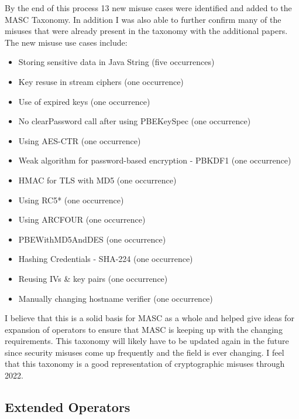 By the end of this process 13 new misuse cases were identified and added to the MASC Taxonomy. In addition I was also able to further confirm many of the misuses that were already present in the taxonomy with the additional papers.
The new misuse use cases include:
\begin{itemize}
    \item Storing sensitive data in Java String (five occurrences)
    \item Key resuse in stream ciphers (one occurrence)
    \item Use of expired keys (one occurrence)
    \item No clearPassword call after using PBEKeySpec (one occurrence)
    \item Using AES-CTR (one occurrence)
    \item Weak algorithm for password-based encryption - PBKDF1 (one occurrence)
    \item HMAC for TLS with MD5 (one occurrence)
    \item Using RC5*  (one occurrence)
    \item Using ARCFOUR (one occurrence)
    \item PBEWithMD5AndDES (one occurrence)
    \item Hashing Credentials - SHA-224 (one occurrence)
    \item Reusing IVs \& key pairs (one occurrence)
    \item Manually changing hostname verifier (one occurrence)
\end{itemize}

I believe that this is a solid basis for MASC as a whole and helped give ideas for expansion of operators to ensure that MASC is keeping up with the changing requirements. This taxonomy will likely have to be updated again in the future since security misuses come up frequently and the field is ever changing. I feel that this taxonomy is a good representation of cryptographic misuses through 2022.

\subsection{Extended Operators}
\label{ch2:sec:operators}

